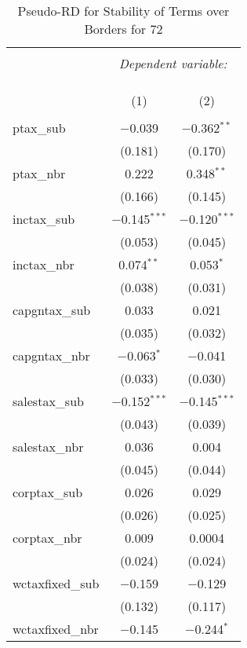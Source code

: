 
\begin{table}[!htbp] \centering 
  \caption{Pseudo-RD for Stability of Terms over Borders for  72} 
  \label{} 
\begin{tabular}{@{\extracolsep{5pt}}lcc} 
\\[-1.8ex]\hline 
\hline \\[-1.8ex] 
 & \multicolumn{2}{c}{\textit{Dependent variable:}} \\ 
\cline{2-3} 
\\[-1.8ex] & \multicolumn{2}{c}{ } \\ 
\\[-1.8ex] & (1) & (2)\\ 
\hline \\[-1.8ex] 
 ptax\_sub & $-$0.039 & $-$0.362$^{**}$ \\ 
  & (0.181) & (0.170) \\ 
  ptax\_nbr & 0.222 & 0.348$^{**}$ \\ 
  & (0.166) & (0.145) \\ 
  inctax\_sub & $-$0.145$^{***}$ & $-$0.120$^{***}$ \\ 
  & (0.053) & (0.045) \\ 
  inctax\_nbr & 0.074$^{**}$ & 0.053$^{*}$ \\ 
  & (0.038) & (0.031) \\ 
  capgntax\_sub & 0.033 & 0.021 \\ 
  & (0.035) & (0.032) \\ 
  capgntax\_nbr & $-$0.063$^{*}$ & $-$0.041 \\ 
  & (0.033) & (0.030) \\ 
  salestax\_sub & $-$0.152$^{***}$ & $-$0.145$^{***}$ \\ 
  & (0.043) & (0.039) \\ 
  salestax\_nbr & 0.036 & 0.004 \\ 
  & (0.045) & (0.044) \\ 
  corptax\_sub & 0.026 & 0.029 \\ 
  & (0.026) & (0.025) \\ 
  corptax\_nbr & 0.009 & 0.0004 \\ 
  & (0.024) & (0.024) \\ 
  wctaxfixed\_sub & $-$0.159 & $-$0.129 \\ 
  & (0.132) & (0.117) \\ 
  wctaxfixed\_nbr & $-$0.145 & $-$0.244$^{*}$ \\ 

\end{tabular}
\end{table}
